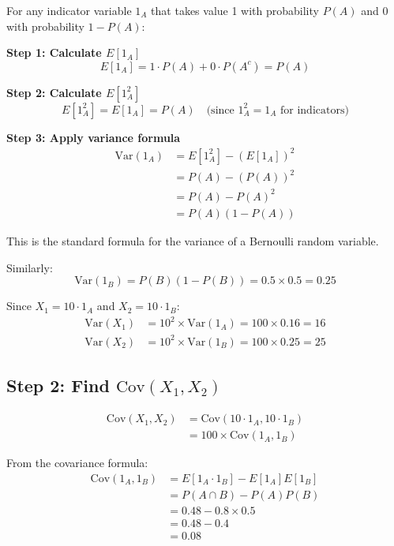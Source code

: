 \documentclass[11pt]{article}
\begin{document}
\begin{tcolorbox}[colback=cyan!5!white,colframe=cyan!75!black,title={Why Does $\text{Var}(1_A) = P(A)(1-P(A))$?}]
For any indicator variable $1_A$ that takes value 1 with probability $P(A)$ and 0 with probability $1-P(A)$:

\textbf{Step 1: Calculate $E[1_A]$}
\begin{equation*}
E[1_A] = 1 \cdot P(A) + 0 \cdot P(A^c) = P(A)
\end{equation*}

\textbf{Step 2: Calculate $E[1_A^2]$}
\begin{equation*}
E[1_A^2] = E[1_A] = P(A) \quad \text{(since $1_A^2 = 1_A$ for indicators)}
\end{equation*}

\textbf{Step 3: Apply variance formula}
\begin{align*}
\text{Var}(1_A) &= E[1_A^2] - (E[1_A])^2\\
&= P(A) - (P(A))^2\\
&= P(A) - P(A)^2\\
&= P(A)(1 - P(A))
\end{align*}

This is the standard formula for the variance of a Bernoulli random variable.
\end{tcolorbox}

Similarly:
\begin{equation}
\text{Var}(1_B) = P(B)(1 - P(B)) = 0.5 \times 0.5 = 0.25
\end{equation}

Since $X_1 = 10 \cdot 1_A$ and $X_2 = 10 \cdot 1_B$:
\begin{align}
\text{Var}(X_1) &= 10^2 \times \text{Var}(1_A) = 100 \times 0.16 = 16\\
\text{Var}(X_2) &= 10^2 \times \text{Var}(1_B) = 100 \times 0.25 = 25
\end{align}

\subsection{Step 2: Find $\text{Cov}(X_1, X_2)$}

\begin{align}
\text{Cov}(X_1, X_2) &= \text{Cov}(10 \cdot 1_A, 10 \cdot 1_B)\\
&= 100 \times \text{Cov}(1_A, 1_B)
\end{align}

From the covariance formula:
\begin{align}
\text{Cov}(1_A, 1_B) &= E[1_A \cdot 1_B] - E[1_A]E[1_B]\\
&= P(A \cap B) - P(A)P(B)\\
&= 0.48 - 0.8 \times 0.5\\
&= 0.48 - 0.4\\
&= 0.08
\end{align}
\end{document}
